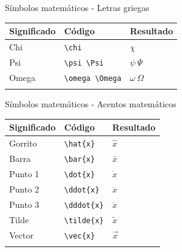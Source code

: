 \documentclass[
  ignorenonframetext,
]{beamer}
\begin{document}
\begin{frame}[fragile]{Símbolos matemáticos - Letras griegas}
\label{suxedmbolos-matemuxe1ticos---letras-griegas-3}
\begin{longtable}[]{@{}lll@{}}
\toprule\noalign{}
Significado & Código & Resultado \\
\midrule\noalign{}
\endhead
Chi & \texttt{\textbackslash{}chi} & \(\chi\) \\
Psi & \texttt{\textbackslash{}psi\ \textbackslash{}Psi} &
\(\psi\ \Psi\) \\
Omega & \texttt{\textbackslash{}omega\ \textbackslash{}Omega} &
\(\omega\ \Omega\) \\
\bottomrule\noalign{}
\end{longtable}
\end{frame}

\begin{frame}[fragile]{Símbolos matemáticos - Acentos matemáticos}
\label{suxedmbolos-matemuxe1ticos---acentos-matemuxe1ticos}
\begin{longtable}[]{@{}lll@{}}
\toprule\noalign{}
Significado & Código & Resultado \\
\midrule\noalign{}
\endhead
Gorrito & \texttt{\textbackslash{}hat\{x\}} & \(\hat{x}\) \\
Barra & \texttt{\textbackslash{}bar\{x\}} & \(\bar{x}\) \\
Punto 1 & \texttt{\textbackslash{}dot\{x\}} & \(\dot{x}\) \\
Punto 2 & \texttt{\textbackslash{}ddot\{x\}} & \(\ddot{x}\) \\
Punto 3 & \texttt{\textbackslash{}dddot\{x\}} & \(\dddot{x}\) \\
Tilde & \texttt{\textbackslash{}tilde\{x\}} & \(\tilde{x}\) \\
Vector & \texttt{\textbackslash{}vec\{x\}} & \(\vec{x}\) \\
\bottomrule\noalign{}
\end{longtable}
\end{frame}
\end{document}
